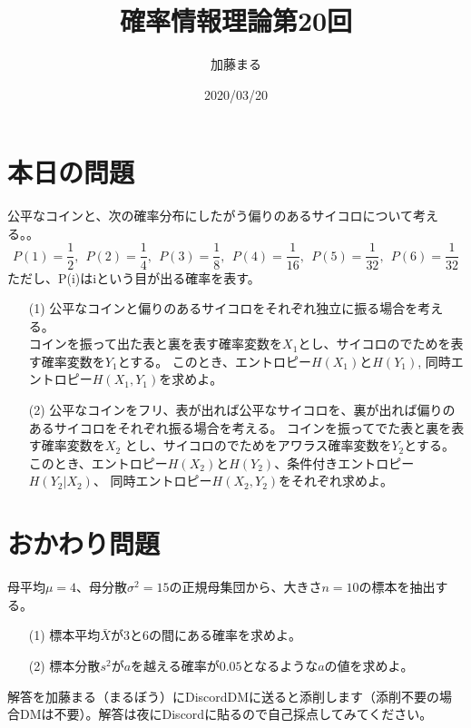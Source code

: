 \documentclass[a4j,uplatex,dvipdfmx]{jsarticle}
\title{確率情報理論第20回}
\author{加藤まる}
\date{2020/03/20}
\begin{document}
\maketitle

\section*{本日の問題}
公平なコインと、次の確率分布にしたがう偏りのあるサイコロについて考える。。
\begin{equation}
  P(1)=\frac{1}{2},~~P(2)=\frac{1}{4},~~P(3)=\frac{1}{8},~~P(4)=\frac{1}{16},~~P(5)=\frac{1}{32},~~P(6)=\frac{1}{32}
\end{equation}
ただし、P(i)はiという目が出る確率を表す。
\begin{itemize}
  \item[(1)] 公平なコインと偏りのあるサイコロをそれぞれ独立に振る場合を考える。\\
  コインを振って出た表と裏を表す確率変数を$X_1$とし、サイコロのでためを表す確率変数を$Y_1$とする。 このとき、エントロピー$H(X_1)$と$H(Y_1)$,
  同時エントロピー$H(X_1,Y_1)$を求めよ。
  \item[(2)]公平なコインをフリ、表が出れば公平なサイコロを、裏が出れば偏りのあるサイコロをそれぞれ振る場合を考える。
  コインを振ってでた表と裏を表す確率変数を$X_2$ とし、サイコロのでためをアワラス確率変数を$Y_2$とする。このとき、エントロピー$H(X_2)$と$H(Y_2)$、条件付きエントロピー$H(Y_2|X_2)$、
  同時エントロピー$H(X_2,Y_2)$をそれぞれ求めよ。\\
\end{itemize}

\section*{おかわり問題}
母平均$\mu=4$、母分散$\sigma ^2=15$の正規母集団から、大きさ$n=10$の標本を抽出する。
\begin{itemize}
  \item[(1)]標本平均$\bar{X}$が$3$と$6$の間にある確率を求めよ。
  \item[(2)]標本分散$s^2$が$a$を越える確率が$0.05$となるような$a$の値を求めよ。\\ 
\end{itemize}
解答を加藤まる（まるぼう）にDiscordDMに送ると添削します（添削不要の場合DMは不要）。解答は夜にDiscordに貼るので自己採点してみてください。
\end{document}
